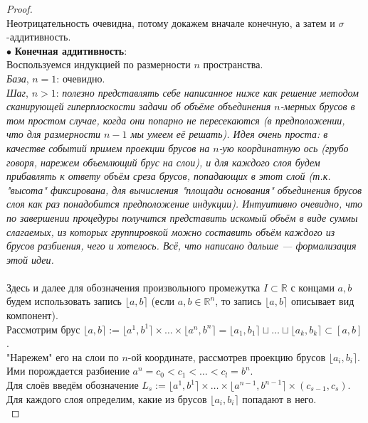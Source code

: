 \documentclass[11pt,a4paper]{report}
\def\Real{\mathbb{R}}
\theoremstyle{definition}
\theoremstyle{definition}
\theoremstyle{definition}
\begin{document}
	\begin{proof}$  $\\
		Неотрицательность очевидна, потому докажем вначале конечную, а затем и $ \sigma $-аддитивность.\\
		$ \bullet $ \textbf{Конечная аддитивность}:\\
		Воспользуемся индукцией по размерности $ n $ пространства.\\
		\textit{База}, $ n = 1 $: очевидно.\\
		\textit{Шаг}, $ n > 1 $: \textit{полезно представлять себе написанное ниже как решение методом сканирующей гиперплоскости задачи об объёме объединения $ n $-мерных брусов в том простом случае, когда они попарно не пересекаются (в предположении, что для размерности $ n-1 $ мы умеем её решать). Идея очень проста: в качестве событий примем проекции брусов на $ n $-ую координатную ось (грубо говоря, нарежем объемлющий брус на слои), и для каждого слоя будем прибавлять к ответу объём среза брусов, попадающих в этот слой (т.к. "высота" фиксирована, для вычисления "площади основания" объединения брусов слоя как раз понадобится предположение индукции). Интуитивно очевидно, что по завершении процедуры получится представить искомый объём в виде суммы слагаемых, из которых группировкой можно составить объём каждого из брусов разбиения, чего и хотелось. Всё, что написано дальше — формализация этой идеи.}\\\\
		Здесь и далее для обозначения произвольного промежутка $ I \subset \mathbb{R} $ с концами $ a, b $ будем использовать запись $ \lfloor a, b \rceil $ (если $ a, b \in \Real^{n} $, то запись $ \lfloor a, b \rceil $ описывает вид компонент).\\
		Рассмотрим брус $ \lfloor a, b \rceil := \lfloor a^{1}, b^{1} \rceil \times \dots \times \lfloor a^{n}, b^{n} \rceil = \lfloor a_{1}, b_{1} \rceil \sqcup \dots \sqcup \lfloor a_{k}, b_{k} \rceil \subset [a, b] $.\\
		"Нарежем" его на слои по $ n $-ой координате, рассмотрев проекцию брусов $ \lfloor a_{i}, b_{i} \rceil $.\\
		Ими порождается разбиение $ a^{n} = c_{0} < c_{1} < \dots < c_{l} = b^{n} $.\\ 
		Для слоёв введём обозначение $ L_{s} := \lfloor a^{1}, b^{1} \rceil \times \dots \times \lfloor a^{n-1}, b^{n-1} \rceil \times (c_{s-1}, c_{s}) $.\\
		Для каждого слоя определим, какие из брусов $ \lfloor a_{i}, b_{i} \rceil $ попадают в него.\\

\end{proof}
\end{document}
